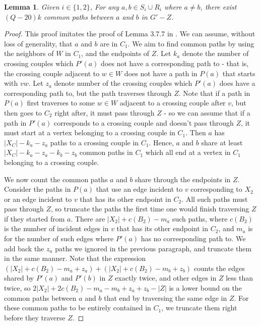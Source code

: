 \documentclass{article}
\newtheorem{lemma}{Lemma}[section]
\begin{document}
\begin{lemma}\label{lem:commonpaths}
    Given $i \in \{1,2\}$, For any $a,b \in S_i \cup R_i$ where $a \not=b $, there exist $(Q-20)k$ common paths between $a$ and $b$ in $G'-Z$. 
\end{lemma}

\begin{proof}

     This proof imitates the proof of Lemma 3.7.7 in \cite{lau-thesis}. We can assume, without loss of generality, that $a$ and $b$ are in $C_1$. We aim to find common paths by using the neighbors of $W$ in $C_1$, and the endpoints of $Z$. Let $k_a$ denote the number of crossing couples which $P'(a)$ does not have a corresponding path to - that is, the crossing couple adjacent to $w \in W$ does not have a path in $P(a)$ that starts with $vw$. Let $z_a$ denote number of the crossing couples which $P'(a)$ does have a corresponding path to, but the path traverses through $Z$. Note that if a path in $P(a)$ first traverses to some $w \in W$ adjacent to a crossing couple after $v$, but then goes to $C_2$ right after, it must pass through $Z$ - so we can assume that if a path in $P'(a)$ corresponds to a crossing couple and doesn't pass through $Z$, it must start at a vertex belonging to a crossing couple in $C_1$. Then $a$ has $|X_C|-k_a-z_a$ paths to a crossing couple in $C_1$. Hence, $a$ and $b$ share at least $|X_C|-k_a-z_a-k_b-z_b$ common paths in $C_1$ which all end at a vertex in $C_1$ belonging to a crossing couple. 

    We now count the common paths $a$ and $b$ share through the endpoints in $Z$. Consider the paths in $P(a)$ that use an edge incident to $v$ corresponding to $X_2$ or an edge incident to $v$ that has its other endpoint in $C_2$. All such paths must pass through $Z$, so truncate the paths the first time one would finish traversing $Z$ if they started from $a$. There are $|X_2|+c(B_2)-m_a$ such paths, where $c(B_2)$ is the number of incident edges in $v$ that has its other endpoint in $C_2$, and $m_a$ is for the number of such edges where $P'(a)$ has no corresponding path to. We add back the $z_a$ paths we ignored in the previous paragraph, and truncate them in the same manner. Note that the expression $(|X_2|+c(B_2)-m_a+z_a) + (|X_2|+c(B_2)-m_b+z_b)$ counts the edges shared by $P'(a)$ and $P'(b)$ in $Z$ exactly twice, and other edges in $Z$ less than twice, so $2|X_2|+2c(B_2)-m_a-m_b+z_a+z_b-|Z|$ is a lower bound on the common paths between $a$ and $b$ that end by traversing the same edge in $Z$. For these common paths to be entirely contained in $C_1$, we truncate them right before they traverse $Z$.


\end{proof}
\end{document}
